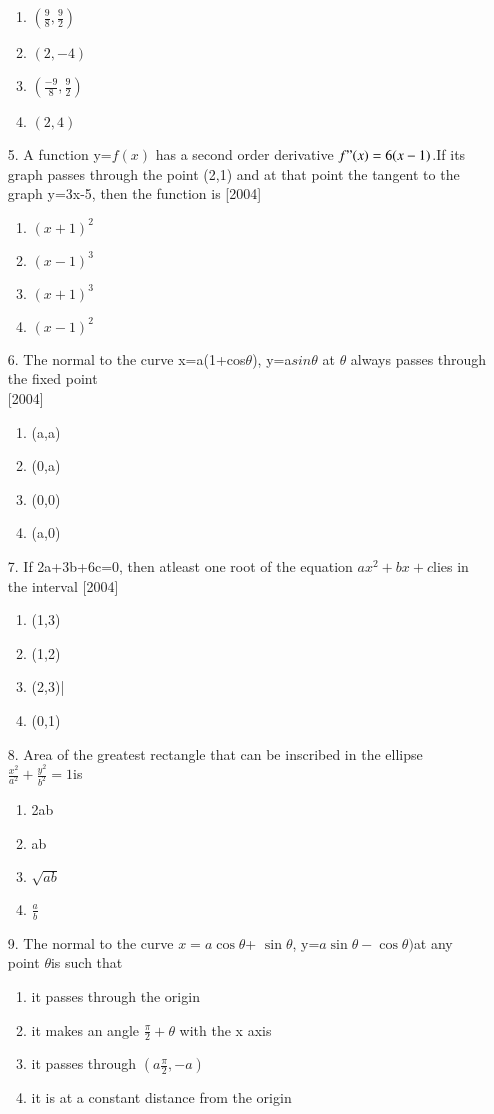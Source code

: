 \documentclass[journal,12pt,twocolumn]{IEEEtran}
\theoremstyle{remark}
\begin{document}
\begin{enumerate}
\begin{enumerate}
    \item $(\frac{9}{8},\frac{9}{2})$
    \item $(2,-4)$
    \item $(\frac{-9}{8},\frac{9}{2})$
    \item $(2,4)$
\end{enumerate}
\item[5.]A function y=$f(x)$ has a second order derivative $f"(x)=6(x-1)$.If its graph passes through the point (2,1) and at that point the tangent to the graph y=3x-5, then the function is \hfill{[2004]}
\begin{enumerate}
    \item $(x+1)^2$
    \item $(x-1)^3$
    \item $(x+1)^3$
    \item $(x-1)^2$
\end{enumerate}
\item[6.]The normal to the curve x=a(1+cos$\theta$), y=a$sin\theta$ at $\theta$ always passes through the fixed point\\ \hfill{[2004]}
\begin{enumerate}
    \item (a,a)
    \item (0,a)
    \item (0,0)
    \item (a,0)
\end{enumerate}
\item[7.]If 2a+3b+6c=0, then atleast one root of the equation $ax^2+bx+c$lies in the interval \hfill{[2004]}
\begin{enumerate}
    \item (1,3)
    \item (1,2)
    \item (2,3)|
    \item (0,1)
\end{enumerate}  
 \item[8.]Area of the greatest rectangle that can be inscribed in the ellipse $\frac{x^2}{a^2}+\frac{y^2}{b^2}=1$is 
\begin{enumerate}
    \item 2ab
    \item ab
    \item $\sqrt{ab}$
    \item $\frac{a}{b}$
\end{enumerate}
\item [9.]The normal to the curve $x=a \cos \theta$+ $\sin\theta$, y=$a\sin\theta - \cos \theta)$at any point $\theta$is such that 
\begin{enumerate}
    \item it passes through the origin 
    \item it makes an angle $\frac{\pi}{2}+\theta$ with the x axis 
    \item it passes through $(a\frac{\pi}{2},-a)$
    \item it is at a constant distance from the origin
\end{enumerate} 
\end{enumerate}
\end{document}

